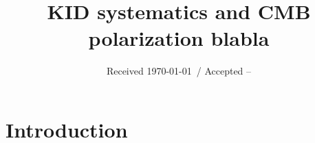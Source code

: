\documentclass[twocolumn, traditabstract]{aa}
\begin{document}
\title{KID systematics and CMB polarization blabla}
%
\date{Received \today \ / Accepted --}
	
\tableofcontents
\maketitle

\section{Introduction}
\label{sec:introduction}



\end{document}
